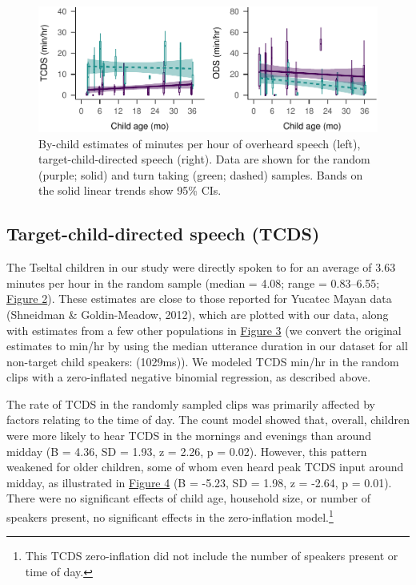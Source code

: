 \documentclass[floatsintext,man]{apa6}
\theoremstyle{definition}
\theoremstyle{definition}
\theoremstyle{definition}
\theoremstyle{remark}
\begin{document}
\begin{figure}
\centering
\includegraphics{Tseltal-CLE_files/figure-latex/fig2-1.pdf}
\caption{\label{fig:fig2}By-child estimates of minutes per hour of overheard
speech (left), target-child-directed speech (right). Data are shown for
the random (purple; solid) and turn taking (green; dashed) samples.
Bands on the solid linear trends show 95\% CIs.}
\end{figure}

\subsection{Target-child-directed speech
(TCDS)}\label{target-child-directed-speech-tcds}

The Tseltal children in our study were directly spoken to for an average
of 3.63 minutes per hour in the random sample (median = 4.08; range =
0.83--6.55; \protect\hyperlink{fig2}{Figure 2}). These estimates are
close to those reported for Yucatec Mayan data (Shneidman \&
Goldin-Meadow, 2012), which are plotted with our data, along with
estimates from a few other populations in
\protect\hyperlink{fig3}{Figure 3} (we convert the original estimates to
min/hr by using the median utterance duration in our dataset for all
non-target child speakers: (1029ms)). We modeled TCDS min/hr in the
random clips with a zero-inflated negative binomial regression, as
described above.

The rate of TCDS in the randomly sampled clips was primarily affected by
factors relating to the time of day. The count model showed that,
overall, children were more likely to hear TCDS in the mornings and
evenings than around midday (B = 4.36, SD = 1.93, z = 2.26, p = 0.02).
However, this pattern weakened for older children, some of whom even
heard peak TCDS input around midday, as illustrated in
\protect\hyperlink{fig4}{Figure 4} (B = -5.23, SD = 1.98, z = -2.64, p =
0.01). There were no significant effects of child age, household size,
or number of speakers present, no significant effects in the
zero-inflation model.\footnote{This TCDS zero-inflation did not include
  the number of speakers present or time of day.}
\end{document}
